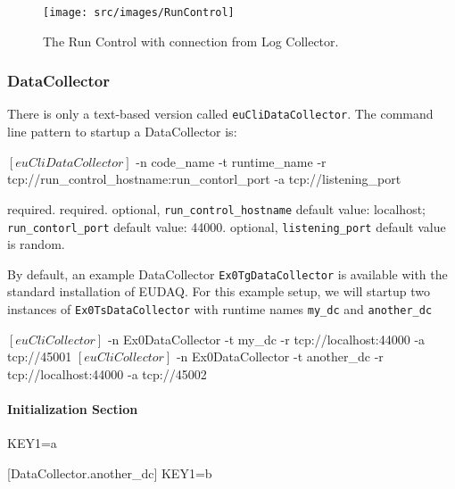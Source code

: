 \begin{figure}[htb]
  \begin{center}
    \texttt{[image: src/images/RunControl]}
    \caption{The Run Control with connection from Log Collector.}
    \label{fig:RunControl_con_log}
  \end{center}
\end{figure}


\subsubsection{DataCollector}
\label{sec:datacollector}
There is only a text-based version called \texttt{euCliDataCollector}.
The command line pattern to startup a DataCollector is:
\begin{listing}[mybash]
$[euCliDataCollector]$ -n {code_name} -t {runtime_name} -r tcp://{run_control_hostname}:{run_contorl_port} -a tcp://{listening_port}
\end{listing}

\begin{description}
required.
required.
optional, \texttt{run\_control\_hostname} default value: localhost;  \texttt{run\_contorl\_port}  default value: 44000.
optional, \texttt{listening\_port} default value is random.
\end{description}

By default, an example DataCollector \texttt{Ex0TgDataCollector} is available with the standard installation of EUDAQ.
For this example setup, we will startup two instances of \texttt{Ex0TsDataCollector} with runtime names \texttt{my\_dc} and \texttt{another\_dc}\\
\begin{listing}[mybash]
$[euCliCollector]$ -n Ex0DataCollector -t my_dc -r tcp://localhost:44000 -a tcp://45001
$[euCliCollector]$ -n Ex0DataCollector -t another_dc -r tcp://localhost:44000 -a tcp://45002
\end{listing}

\paragraph{Initialization Section}
\begin{listing}[conf]
[DataCollector.my_dc]
KEY1=a

[DataCollector.another_dc]
KEY1=b
\end{listing}

